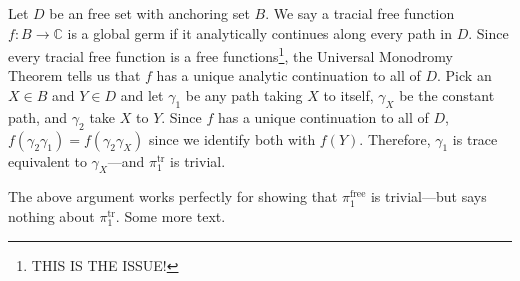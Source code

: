 \documentclass[11pt]{exam}
\newcommand{\CC}{\mathbb{C}}
\begin{document}
Let $D$ be an free set with anchoring set $B$. We say a tracial free function
$f: B \to \CC $ is a global germ if it analytically continues along every path
in $D$. Since every tracial free function is a free functions\footnote{THIS IS
  THE ISSUE!},  the
Universal Monodromy Theorem tells us that $f$ has a unique analytic
continuation to all of $D$. Pick an $X \in B$ and $Y \in D$ and
let $\gamma_1$ be any path taking $X$ to itself, $\gamma_X$ be the constant
path, and $\gamma_2$ take $X$ to  $Y$. Since $f$ has a unique continuation to all of $D$,
$f(\gamma_2\gamma_1) = f(\gamma_2\gamma_X)$ since we identify both with $f(Y)$.
Therefore, $\gamma_1$ is trace equivalent to $\gamma_X$---and
$\pi_1^{\text{tr} }$ is trivial.

The above argument works perfectly for showing that $\pi_1^{\text{free} }$ is
trivial---but says nothing about $\pi_1^{\text{tr} }$. Some more text.
\end{document}
